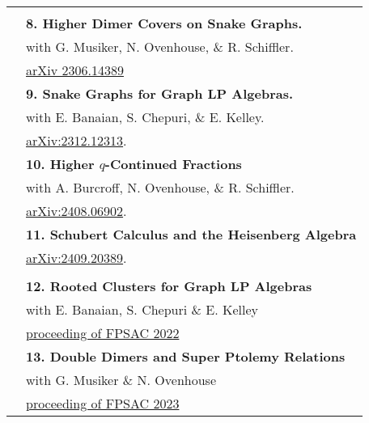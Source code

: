 \documentclass[letterpaper, 11pt,times]{article}
\newcommand{\mycolor}[0]{\color{RoyalBlue}}
\newlength{\myl}
\newcommand{\ind}[0]{\hspace{\myl}}
\newlength{\newl}
\newcommand{\paper}[2]{
\settowidth{\newl}{\textbf{#1. \ }}
\noindent
\hspace{\dimexpr\myl - \newl}
\textbf{#1. #2}
}
\begin{document}
\begin{longtable}{p{1in}p{5in}}
&\\

\nohyphens{\mycolor{Preprints}}
&\paper{8}{Higher Dimer Covers on Snake Graphs.}\\
&\ind  with  G. Musiker, N. Ovenhouse, \& R. Schiffler. \\
&\ind \href{https://arxiv.org/abs/2306.14389}{arXiv 2306.14389}\\

&\paper{9}{Snake Graphs for Graph LP Algebras.}\\
&\ind  with E. Banaian, S. Chepuri, \& E. Kelley.\\
&\ind\href{https://arxiv.org/abs/2312.12313}{	arXiv:2312.12313}. \\

&\paper{10}{Higher $q$-Continued Fractions}\\
&\ind  with A. Burcroff, N. Ovenhouse, \& R. Schiffler.\\
&\ind\href{https://arxiv.org/abs/2408.06902}{	arXiv:2408.06902}. \\

&\paper{11}{Schubert Calculus and the Heisenberg Algebra}\\
&\ind\href{https://arxiv.org/abs/2409.20389}{	arXiv:2409.20389}. \\

&\\
\nohyphens{\mycolor{Proceedings}}
&\paper{12}{Rooted Clusters for Graph LP Algebras}\\
&\ind  with E. Banaian, S. Chepuri \& E. Kelley\\
&\ind \href{https://www.mat.univie.ac.at/~slc/wpapers/FPSAC2022/52.pdf}{proceeding of FPSAC 2022}\\
&\paper{13}{Double Dimers and Super Ptolemy Relations}\\
&\ind  with G. Musiker \& N. Ovenhouse\\
&\ind \href{https://www.mat.univie.ac.at/~slc/wpapers/FPSAC2023/79.pdf}{proceeding of FPSAC 2023}\\


\end{longtable}
\end{document}
